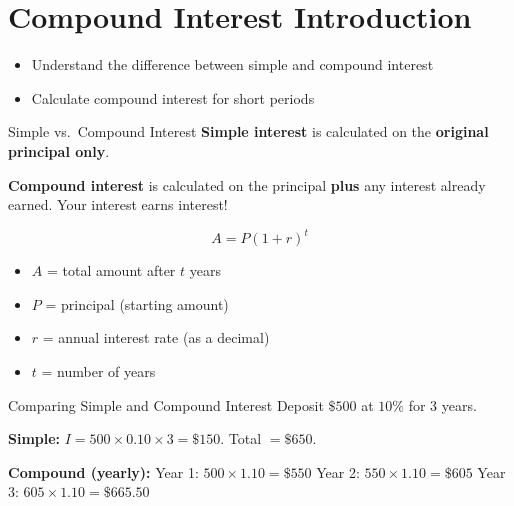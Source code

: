 \section{Compound Interest Introduction}

\begin{learningGoals}
\begin{itemize}
    \item Understand the difference between simple and compound interest
    \item Calculate compound interest for short periods
\end{itemize}
\end{learningGoals}

\begin{conceptBox}{Simple vs.\ Compound Interest}
\textbf{Simple interest} is calculated on the \textbf{original principal only}.

\textbf{Compound interest} is calculated on the principal \textbf{plus} any interest already earned. Your interest earns interest!

$$A = P(1 + r)^t$$
\begin{itemize}[leftmargin=*]
    \item $A$ = total amount after $t$ years
    \item $P$ = principal (starting amount)
    \item $r$ = annual interest rate (as a decimal)
    \item $t$ = number of years
\end{itemize}
\end{conceptBox}

\begin{workedExample}{Comparing Simple and Compound Interest}
Deposit $\$500$ at $10\%$ for $3$ years.

\textbf{Simple:} $I = 500 \times 0.10 \times 3 = \$150$. Total $= \$650$.

\textbf{Compound (yearly):}
Year 1: $500 \times 1.10 = \$550$
Year 2: $550 \times 1.10 = \$605$
Year 3: $605 \times 1.10 = \$665.50$
\end{workedExample}


